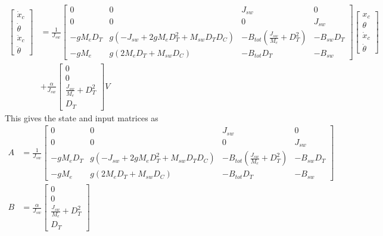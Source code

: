 \documentclass[11pt,a4paper]{article}
\begin{document}
\begin{equation}
	\begin{aligned}
		\begin{bmatrix}
			\dot{x}_c    \\
			\dot{\theta} \\
			\ddot{x}_c   \\
			\ddot{\theta}
		\end{bmatrix}
		 & =
		\frac{1}{J_{sw}}
		\begin{bmatrix}
			0        & 0                                                         & J_{sw}                             & 0          \\
			0        & 0                                                         & 0                                  & J_{sw}     \\
			-gM_eD_T & g( -J_{sw} + 2gM_eD_T^2 + M_{sw}D_TD_C) & -B_{tot}(\frac{J_{sw}}{M_e}+D_T^2) & -B_{sw}D_T \\
			-gM_e    & g(2M_eD_T + M_{sw}D_C)                  & -B_{tot}D_T                        & -B_{sw}
		\end{bmatrix}
		\begin{bmatrix}
			x_c       \\
			\theta    \\
			\dot{x}_c \\
			\dot{\theta}
		\end{bmatrix} \\
		 & +
		\frac{\alpha}{J_{sw}}
		\begin{bmatrix}
			0                          \\
			0                          \\
			\frac{J_{sw}}{M_e} + D_T^2 \\
			D_T
		\end{bmatrix}
		V
	\end{aligned}
\end{equation}
This gives the state and input matrices as
\begin{align*}
	A & =
	\frac{1}{J_{sw}}
	\begin{bmatrix}
		0        & 0                                                         & J_{sw}                             & 0          \\
		0        & 0                                                         & 0                                  & J_{sw}     \\
		-gM_eD_T & g( -J_{sw} + 2gM_eD_T^2 + M_{sw}D_TD_C) & -B_{tot}(\frac{J_{sw}}{M_e}+D_T^2) & -B_{sw}D_T \\
		-gM_e    & g(2M_eD_T + M_{sw}D_C)                  & -B_{tot}D_T                        & -B_{sw}
	\end{bmatrix} \\
	B & = \frac{\alpha}{J_{sw}}
	\begin{bmatrix}
		0                          \\
		0                          \\
		\frac{J_{sw}}{M_e} + D_T^2 \\
		D_T
	\end{bmatrix}
\end{align*}
\end{document}
